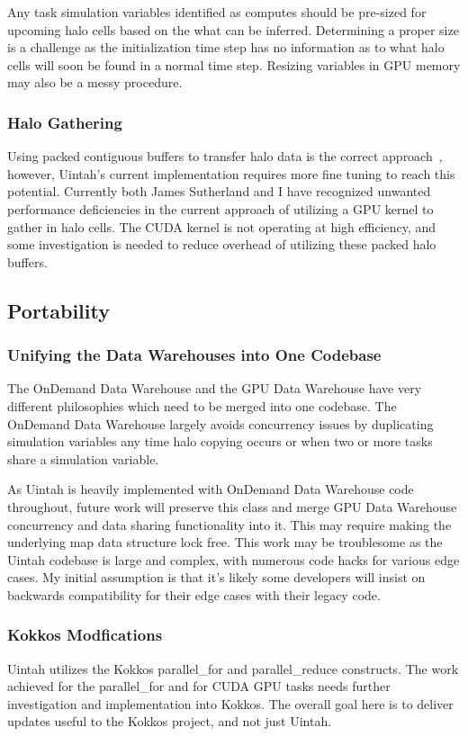 \documentclass[12pt]{article}
\begin{document}
Any task simulation variables identified as computes should be pre-sized for upcoming halo cells based on the what can be inferred.  Determining a proper size is a challenge as the initialization time step has no information as to what halo cells will soon be found in a normal time step.  Resizing variables in GPU memory may also be a messy procedure.  

\subsubsection{Halo Gathering}
\label{ch:workplan-halo-gathering}
Using packed contiguous buffers to transfer halo data is the correct approach~\cite{ijpp16}, however, Uintah's current implementation requires more fine tuning to reach this potential. Currently both James Sutherland and I have recognized unwanted performance deficiencies in the current approach of utilizing a GPU kernel to gather in halo cells.   The CUDA kernel is not operating at high efficiency, and some investigation is needed to reduce overhead of utilizing these packed halo buffers. 

\subsection{Portability}
\label{ch:workplan-portability}
\subsubsection{Unifying the Data Warehouses into One Codebase}
\label{ch:workplan-unified-data-warehouse}
The OnDemand Data Warehouse and the GPU Data Warehouse have very different philosophies which need to be merged into one codebase.  The OnDemand Data Warehouse largely avoids concurrency issues by duplicating simulation variables any time halo copying occurs or when two or more tasks share a simulation variable.  

As Uintah is heavily implemented with OnDemand Data Warehouse code throughout, future work will preserve this class and merge GPU Data Warehouse concurrency and data sharing functionality into it.  This may require making the underlying map data structure lock free.  This work may be troublesome as the Uintah codebase is large and complex, with numerous code hacks for various edge cases.  My initial assumption is that it's likely some developers will insist on backwards compatibility for their edge cases with their legacy code.

\subsubsection{Kokkos Modfications}
\label{ch:workplan-kokkos-modifications}
Uintah utilizes the Kokkos parallel\_for and parallel\_reduce constructs.  The work achieved for the parallel\_for and for CUDA GPU tasks needs further investigation and implementation into Kokkos.  The overall goal here is to deliver updates useful to the Kokkos project, and not just Uintah. 
\end{document}
